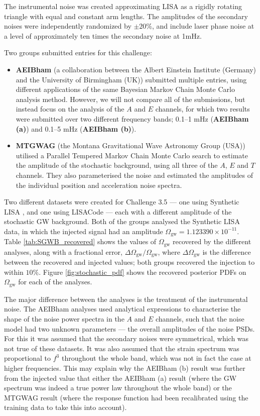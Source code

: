 \documentclass{iopart}
\begin{document}
The instrumental noise was created approximating LISA as a rigidly rotating
triangle with equal and constant arm lengths.
The amplitudes of the 
secondary noises were independently randomized  by $\pm 20\%$,
and include laser phase noise at a level of approximately ten times the secondary 
noise at 1mHz.

Two groups submitted entries for this challenge:
\begin{itemize}
\item \textbf{AEIBham} (a collaboration between the Albert Einstein Institute
(Germany) and the University of Birmingham (UK)) submitted multiple entries,
using different applications of the same Bayesian Markov Chain Monte Carlo
analysis method. However, we will not compare all of the submissions, but
instead focus on the analysis of the $A$ and $E$ channels, for which two results were submitted
over two different frequency bands; 0.1--1 mHz (\textbf{AEIBham (a)})
and 0.1--5 mHz (\textbf{AEIBham (b)}).
\item \textbf{MTGWAG} (the Montana Gravitational Wave Astronomy Group (USA)) 
utilised a Parallel Tempered Markov Chain Monte Carlo search to
estimate the amplitude of the stochastic background, using all three of the 
$A$, $E$ and $T$ channels. They also parameterised
the noise and estimated the amplitudes of the individual position and 
acceleration noise spectra.
\end{itemize}

Two different datasets were created for Challenge 3.5 --- one using 
Synthetic LISA \cite{synthlisa}, and one using LISACode \cite{lisacode} ---
each with a different amplitude of the stochastic GW background.
Both of the groups 
analysed the Synthetic LISA data, in which the injected signal had
an amplitude
$\Omega_{\mathrm{gw}}=1.123390\times 10^{-11}$. Table \ref{tab:SGWB_recovered}
shows the values of $\Omega_{\mathrm{gw}}$ recovered by the different
analyses, along with a fractional error, 
$\Delta \Omega_{\mathrm{gw}}/\Omega_{\mathrm{gw}}$,
where $\Delta \Omega_{\mathrm{gw}}$ is the difference between the recovered
and injected values; both groups recovered the injection
to within $10\%$. 
Figure \ref{fig:stochastic_pdf} shows the recovered posterior PDFs on 
$\Omega_{\mathrm{gw}}$ for each of the analyses. 

The major difference between the analyses is the treatment of the instrumental
noise. 
The AEIBham analyses 
used analytical expressions to characterise the shape of the noise power spectra
in the $A$ and $E$ channels, such that the noise model had two unknown parameters ---
the overall amplitudes of the noise PSDs.
For this it was assumed that the secondary noises were symmetrical,
which was not true of these datasets. It was also assumed that the strain spectrum was
proportional to $f^3$ throughout the whole band, which was not in fact the case at higher frequencies. This
may explain why the AEIBham (b) result was further from the injected
value that either the AEIBham (a) result (where the GW spectrum was indeed
a true power law throughout the whole band) or the MTGWAG result (where the 
response function had been recalibrated using the training data to take 
this into account).
\end{document}
